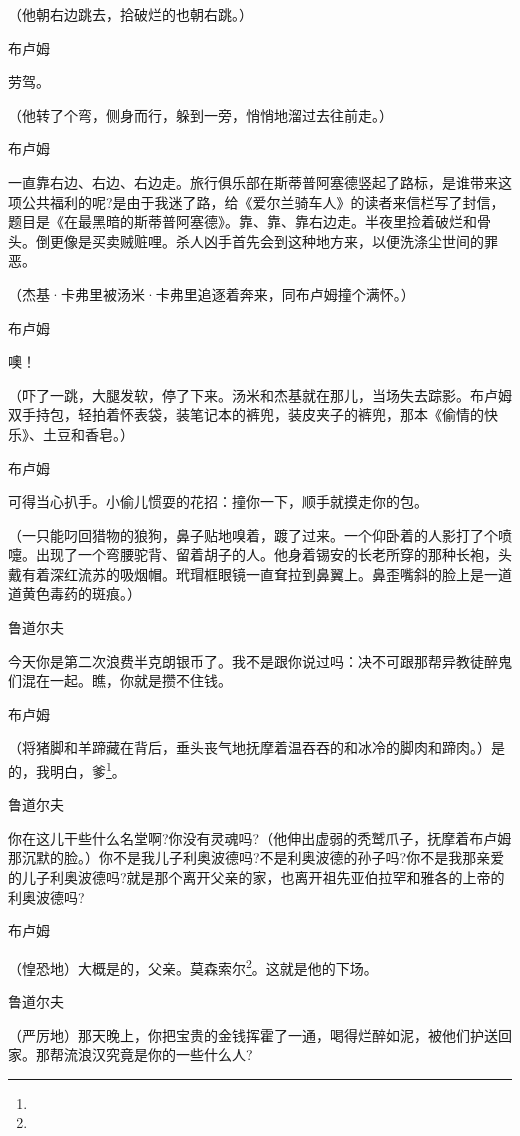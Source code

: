 \par （他朝右边跳去，拾破烂的也朝右跳。）
\par 布卢姆
\par 劳驾。
\par （他转了个弯，侧身而行，躲到一旁，悄悄地溜过去往前走。）
\par 布卢姆
\par 一直靠右边、右边、右边走。旅行俱乐部在斯蒂普阿塞德竖起了路标，是谁带来这项公共福利的呢?是由于我迷了路，给《爱尔兰骑车人》的读者来信栏写了封信，题目是《在最黑暗的斯蒂普阿塞德》。靠、靠、靠右边走。半夜里捡着破烂和骨头。倒更像是买卖贼赃哩。杀人凶手首先会到这种地方来，以便洗涤尘世间的罪恶。
\par （杰基·卡弗里被汤米·卡弗里追逐着奔来，同布卢姆撞个满怀。）
\par 布卢姆
\par 噢！
\par （吓了一跳，大腿发软，停了下来。汤米和杰基就在那儿，当场失去踪影。布卢姆双手持包，轻拍着怀表袋，装笔记本的裤兜，装皮夹子的裤兜，那本《偷情的快乐》、土豆和香皂。）
\par 布卢姆
\par 可得当心扒手。小偷儿惯耍的花招：撞你一下，顺手就摸走你的包。
\par （一只能叼回猎物的狼狗，鼻子贴地嗅着，踱了过来。一个仰卧着的人影打了个喷嚏。出现了一个弯腰驼背、留着胡子的人。他身着锡安的长老所穿的那种长袍，头戴有着深红流苏的吸烟帽。玳瑁框眼镜一直耷拉到鼻翼上。鼻歪嘴斜的脸上是一道道黄色毒药的斑痕。）
\par 鲁道尔夫
\par 今天你是第二次浪费半克朗银币了。我不是跟你说过吗：决不可跟那帮异教徒醉鬼们混在一起。瞧，你就是攒不住钱。
\par 布卢姆
\par （将猪脚和羊蹄藏在背后，垂头丧气地抚摩着温吞吞的和冰冷的脚肉和蹄肉。）是的，我明白，爹\footnote{}。
\par 鲁道尔夫
\par 你在这儿干些什么名堂啊?你没有灵魂吗?（他伸出虚弱的秃鹫爪子，抚摩着布卢姆那沉默的脸。）你不是我儿子利奥波德吗?不是利奥波德的孙子吗?你不是我那亲爱的儿子利奥波德吗?就是那个离开父亲的家，也离开祖先亚伯拉罕和雅各的上帝的利奥波德吗?
\par 布卢姆
\par （惶恐地）大概是的，父亲。莫森索尔\footnote{}。这就是他的下场。
\par 鲁道尔夫
\par （严厉地）那天晚上，你把宝贵的金钱挥霍了一通，喝得烂醉如泥，被他们护送回家。那帮流浪汉究竟是你的一些什么人?
